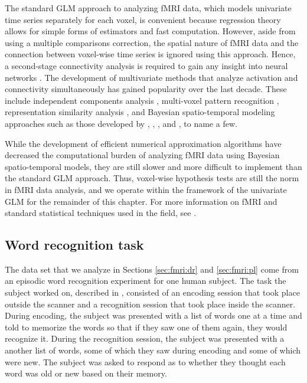 The standard GLM approach to analyzing fMRI data, which models univariate time series separately for each voxel, is convenient because regression theory allows for simple forms of estimators and fast computation. However, aside from using a multiple comparisons correction, the spatial nature of fMRI data and the connection between voxel-wise time series is ignored using this approach. Hence, a second-stage connectivity analysis is required to gain any insight into neural networks \cite[Chapters 8 and 9][]{ashby:fmri:2011}. The development of multivariate methods that analyze activation and connectivity simultaneously has gained popularity over the last decade. These include independent components analysis \citep{beck:smith:ica:2004}, multi-voxel pattern recognition \citet{norman:mvpa:2006}, representation similarity analysis \citep{nili:rs:2014}, and Bayesian spatio-temporal modeling approaches such as those developed by \citet{wool:jenk:bayesSp:2004}, \citet{bowman:2008:SpMCMC}, \citet{quiros:diez:2010:BayesSpTemp}, and \citet{zhang:guin:2014:npBayesWave}, to name a few.

While the development of efficient numerical approximation algorithms have decreased the computational burden of analyzing fMRI data using Bayesian spatio-temporal models, they are still slower and more difficult to implement than the standard GLM approach. Thus, voxel-wise hypothesis tests are still the norm in fMRI data analysis, and we operate within the framework of the univariate GLM for the remainder of this chapter. For more information on fMRI and standard statistical techniques used in the field, see \citet{ashby:fmri:2011, penny:spm:2011}.

\subsection{Word recognition task \label{sec:fmri:data}}

The data set that we analyze in Sections \ref{sec:fmri:dr} and \ref{sec:fmri:pl} come from an episodic word recognition experiment for one human subject. The task the subject worked on, described in \citet{bennett:miller:2013}, consisted of an encoding session that took place outside the scanner and a recognition session that took place inside the scanner. During encoding, the subject was presented with a list of words one at a time and told to memorize the words so that if they saw one of them again, they would recognize it. During the recognition session, the subject was presented with a another list of words, some of which they saw during encoding and some of which were new. The subject was asked to respond as to whether they thought each word was old or new based on their memory.

